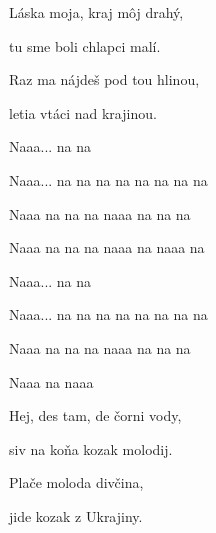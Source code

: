 \begin{song}
\bigskip

 \par
{}Láska moja, kraj môj drahý, \par
{}tu sme boli chlapci malí. \par
{}Raz ma nájdeš pod tou hlinou, \par
{}letia vtáci nad krajinou. \par

\bigskip

\Refren

\bigskip


 \par
{}Naaa...   na na \par
{}Naaa... na na na na na na na na \par
{}Naaa na na na naaa na na na \par
{}Naaa na na na naaa na naaa na \par

\bigskip

Naaa...   na na \par
{}Naaa... na na na na na na na na \par
{}Naaa na na na naaa na na na \par
{}Naaa na naaa  \par

\bigskip



 \par
{}Hej, des tam, de čorni vody,\par
{}siv na koňa kozak molodij. \par
{}Plače moloda divčina, \par
{}jide kozak z Ukrajiny. \par

\bigskip

\Refren

\end{song}
